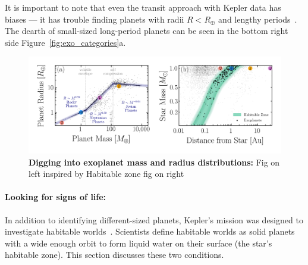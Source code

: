 It is important to note that even the transit approach with Kepler data has biases — it has trouble finding planets with radii $R<R_{\oplus}$ and lengthy periods~\cite{kepler_mission}.
The dearth of small-sized long-period planets can be seen in the bottom right side Figure~\ref{fig:exo_categories}a.


\begin{figure}
\begin{center}
  \centerline{\includegraphics[width=1.1\linewidth]{src/figures/radii_and_mass_relations.png}}
  \caption{\textbf{Digging into exoplanet mass and radius distributions:} 
  Fig on left inspired by \cite{Chen:2017:ApJ}
  Habitable zone fig on right 
  }
  \label{fig:exo_mass_radius_relations}
\end{center}
\end{figure}



\paragraph{Looking for signs of life:}
In addition to identifying different-sized planets, Kepler's mission was designed to investigate habitable worlds~\cite{kepler_mission}. 
Scientists define habitable worlds as solid planets with a wide enough orbit to form liquid water on their surface (the star's habitable zone).
This section discusses these two conditions.

